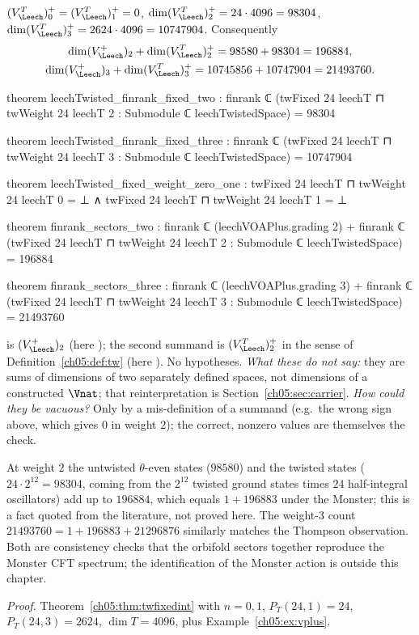 \begin{theorem}\label{ch05:thm:tw23}
$(V_\Leech^T)^+_0 = (V_\Leech^T)^+_1 = 0$, $\dim(V_\Leech^T)^+_2 = 24\cdot4096 = 98304$,
$\dim(V_\Leech^T)^+_3 = 2624\cdot4096 = 10747904$. Consequently
\begin{gather*}
  \dim(V_\Leech^+)_2 + \dim(V_\Leech^T)^+_2 = 98580 + 98304 = 196884,\\
  \dim(V_\Leech^+)_3 + \dim(V_\Leech^T)^+_3 = 10745856 + 10747904 = 21493760 .
\end{gather*}
\end{theorem}
\begin{leancode}
theorem leechTwisted_finrank_fixed_two :
    finrank ℂ (twFixed 24 leechT ⊓ twWeight 24 leechT 2 : Submodule ℂ leechTwistedSpace)
      = 98304

theorem leechTwisted_finrank_fixed_three :
    finrank ℂ (twFixed 24 leechT ⊓ twWeight 24 leechT 3 : Submodule ℂ leechTwistedSpace)
      = 10747904

theorem leechTwisted_fixed_weight_zero_one :
    twFixed 24 leechT ⊓ twWeight 24 leechT 0 = ⊥ ∧ twFixed 24 leechT ⊓ twWeight 24 leechT 1 = ⊥

theorem finrank_sectors_two :
    finrank ℂ (leechVOAPlus.grading 2)
      + finrank ℂ (twFixed 24 leechT ⊓ twWeight 24 leechT 2 : Submodule ℂ leechTwistedSpace)
      = 196884

theorem finrank_sectors_three :
    finrank ℂ (leechVOAPlus.grading 3)
      + finrank ℂ (twFixed 24 leechT ⊓ twWeight 24 leechT 3 : Submodule ℂ leechTwistedSpace)
      = 21493760
\end{leancode}
\begin{dictionary}
 is $(V_\Leech^+)_2$ (here ); the second summand is
$(V_\Leech^T)^+_2$ in the sense of Definition~\ref{ch05:def:tw} (here ). No hypotheses.
\emph{What these do not say:} they are sums of dimensions of two separately defined spaces, not
dimensions of a constructed $\Vnat$; that reinterpretation is Section~\ref{ch05:sec:carrier}.
\emph{How could they be vacuous?} Only by a mis-definition of a summand (e.g.\ the wrong sign above,
which gives $0$ in weight $2$); the correct, nonzero values are themselves the check.
\end{dictionary}

\begin{physics}
At weight $2$ the untwisted $\theta$-even states ($98580$) and the twisted states ($24\cdot2^{12}=98304$, coming from the $2^{12}$ twisted ground states times $24$ half-integral oscillators) add up to $196884$, which equals $1+196883$ under the Monster; this is a fact quoted from the literature, not proved here. The weight-$3$ count $21493760=1+196883+21296876$ similarly matches the Thompson observation. Both are consistency checks that the orbifold sectors together reproduce the Monster CFT spectrum; the identification of the Monster action is outside this chapter.
\end{physics}
\noindent\emph{Proof.} Theorem~\ref{ch05:thm:twfixedint} with $n = 0,1$, $P_T(24,1) = 24$, $P_T(24,3) =
2624$, $\dim T = 4096$, plus Example~\ref{ch05:ex:vplus}.

